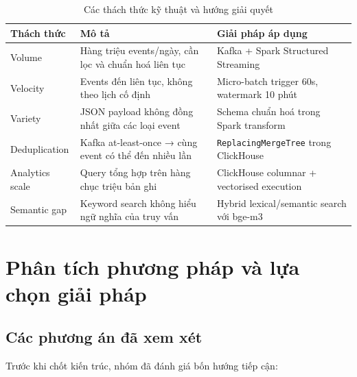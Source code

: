 \documentclass[12pt,a4paper]{article}
\newcommand{\tech}[1]{\texttt{#1}}
\begin{document}
\begin{table}[H]
  \centering
  \caption{Các thách thức kỹ thuật và hướng giải quyết}
  \begin{tabularx}{\linewidth}{lXp{4cm}}
    \toprule
    \textbf{Thách thức} & \textbf{Mô tả} & \textbf{Giải pháp áp dụng} \\
    \midrule
    Volume          & Hàng triệu events/ngày, cần lọc và chuẩn hoá liên tục
                    & Kafka + Spark Structured Streaming \\
    Velocity        & Events đến liên tục, không theo lịch cố định
                    & Micro-batch trigger 60s, watermark 10 phút \\
    Variety         & JSON payload không đồng nhất giữa các loại event
                    & Schema chuẩn hoá trong Spark transform \\
    Deduplication   & Kafka at-least-once → cùng event có thể đến nhiều lần
                    & \tech{ReplacingMergeTree} trong ClickHouse \\
    Analytics scale & Query tổng hợp trên hàng chục triệu bản ghi
                    & ClickHouse columnar + vectorised execution \\
    Semantic gap    & Keyword search không hiểu ngữ nghĩa của truy vấn
                    & Hybrid lexical/semantic search với bge-m3 \\
    \bottomrule
  \end{tabularx}
\end{table}

\section{Phân tích phương pháp và lựa chọn giải pháp}

\subsection{Các phương án đã xem xét}

Trước khi chốt kiến trúc, nhóm đã đánh giá bốn hướng tiếp cận:
\end{document}

